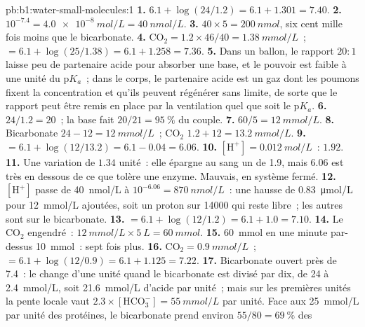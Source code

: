 \begin{solution}{pb:b1:water-small-molecules:1}
\textbf{1.} $6.1 + \log(24/1.2) = 6.1 + 1.301 = 7.40$.
\textbf{2.} $10^{-7.4} = \qty{4.0e-8}{mol/L} = \qty{40}{nmol/L}$.
\textbf{3.} $40\times 5 = \qty{200}{nmol}$, six cent mille fois moins
que le bicarbonate.
\textbf{4.} $\mathrm{CO_2} = 1.2\times 46/40 = \qty{1.38}{mmol/L}$~;
 $= 6.1 + \log(25/1.38) = 6.1 + 1.258 = 7.36$.
\textbf{5.} Dans un ballon, le rapport $20:1$ laisse peu de partenaire
acide pour absorber une base, et le pouvoir  est faible à une
unité du p$K_a$~; dans le corps, le partenaire acide est un gaz dont les
poumons fixent la concentration et qu'ils peuvent régénérer sans limite,
de sorte que le rapport peut être remis en place par la ventilation quel
que soit le p$K_a$.
\textbf{6.} $24/1.2 = 20$~; la base fait $20/21 = \qty{95}{\%}$ du couple.
\textbf{7.} $60/5 = \qty{12}{mmol/L}$.
\textbf{8.} Bicarbonate $24 - 12 = \qty{12}{mmol/L}$~; $\mathrm{CO_2}$
$1.2 + 12 = \qty{13.2}{mmol/L}$.
\textbf{9.}  $= 6.1 + \log(12/13.2) = 6.1 - 0.04 = 6.06$.
\textbf{10.} $[\mathrm{H^+}] = \qty{0.012}{mol/L}$~:  $1.92$.
\textbf{11.} Une variation de $1.34$ unité~: elle épargne au sang un 
de 1.9, mais 6.06 est très en dessous de ce que tolère une enzyme.
Mauvais, en système fermé.
\textbf{12.} $[\mathrm{H^+}]$ passe de \qty{40}{nmol/L} à $10^{-6.06} = \qty{870}{nmol/L}$~: une hausse de \qty{0.83}{\micro mol/L} pour \qty{12}{mmol/L} ajoutées, soit un proton sur \num{14000} qui reste libre~; les autres sont sur le bicarbonate.
\textbf{13.}  $= 6.1 + \log(12/1.2) = 6.1 + 1.0 = 7.10$.
\textbf{14.} Le $\mathrm{CO_2}$ engendré~: $\qty{12}{mmol/L}\times
\qty{5}{L} = \qty{60}{mmol}$.
\textbf{15.} \qty{60}{mmol} en une minute par-dessus \qty{10}{mmol}~:
sept fois plus.
\textbf{16.} $\mathrm{CO_2} = \qty{0.9}{mmol/L}$~;  $= 6.1 +
\log(12/0.9) = 6.1 + 1.125 = 7.22$.
\textbf{17.} Bicarbonate ouvert près de 7.4~: le  change d'une unité
quand le bicarbonate est divisé par dix, de \qty{24}{} à
\qty{2.4}{mmol/L}, soit \qty{21.6}{mmol/L} d'acide par unité~; mais sur
les premières unités la pente locale vaut $2.3\times[\mathrm{HCO_3^-}] =
\qty{55}{mmol/L}$ par unité. Face aux \qty{25}{mmol/L} par unité des
protéines, le bicarbonate prend environ $55/80 = \qty{69}{\%}$ des

\end{solution}
